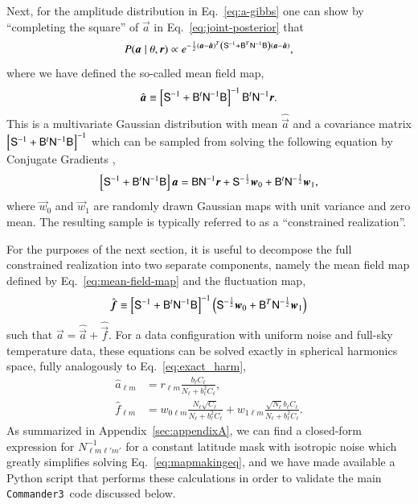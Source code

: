 \documentclass[twocolumn]{../common/aa}
\def\commanderthree{\texttt{Commander3}}
\newcommand{\B}[0]{\tens{B}}
\renewcommand{\a}[0]{\vec{a}}
\newcommand{\f}[0]{\vec{f}}
\newcommand{\N}[0]{\tens{N}}
\newcommand{\w}[0]{\vec{w}}
\renewcommand{\S}[0]{\tens{S}}
\renewcommand{\r}[0]{\vec{r}}
\begin{document}
Next, for the amplitude distribution in Eq.~\eqref{eq:a-gibbs} one can show by ``completing the square'' of $\a$ in Eq.~\eqref{eq:joint-posterior} that 
\begin{equation}
    P(\a \mid \theta, \r) \propto e^{-\frac12 \left(\a - \hat{\a}\right)^T \left(\S^{-1} + \B^T\N^{-1}\B\right) \left(\a - {\hat{\a}}\right)},
\end{equation}
where we have defined the so-called mean field map,
\begin{equation}
\label{eq:mean-field-map}
\hat{\a} \equiv \left[\S^{-1} + \B^t \N^{-1}\B \right]^{-1} \B^t \N^{-1} \r.
\end{equation}
This is a multivariate Gaussian distribution with mean $\hat{\a}$ and a covariance matrix $\left[\S^{-1} + \B^t \N^{-1}\B \right]^{-1}$ which can be sampled from solving the following equation by Conjugate Gradients \citep{shewchuk:1994,seljebotn:2019},
\begin{equation}
    \label{eq:mapmakingeq}
    \left[\S^{-1} + \B^t \N^{-1}\B \right]\a = \B \N^{-1} \r + \S^{-\frac{1}{2}}\w_0 +\B^t \N^{-\frac{1}{2}}\w_1,
\end{equation}
where $\w_0$ and $\w_1$ are randomly drawn Gaussian maps with unit variance and zero mean. The resulting sample is typically referred to as a ``constrained realization''.

For the purposes of the next section, it is useful to decompose the full constrained realization into two separate components, namely the mean field map defined by Eq.~\eqref{eq:mean-field-map} and the fluctuation map, 
\begin{equation}
\label{eq:fluc-map}
\hat{\f} \equiv \left[\S^{-1} + \B^t \N^{-1}\B \right]^{-1} \left(\S^{-\frac{1}{2}}\w_0 +\B^T \N^{-\frac{1}{2}}\w_1 \right)
\end{equation}
such that $\a = \hat{\a} + \hat{\f}$. For a data configuration with uniform noise and full-sky temperature data, these equations can be solved exactly in spherical harmonics space, fully analogously to Eq.~\eqref{eq:exact_harm},
\begin{align}
    \label{eq:hat_s_approx}
    \hat{a}_{\ell m} &= r_{\ell m}\frac{b_{\ell}C_{\ell}}{N_\ell + b_{\ell}^2C_{\ell}},\\
    \label{eq:hat_f_approx}
    \hat{f}_{\ell m} &= w_{0\ell m}\frac{N_{\ell}\sqrt{C_{\ell}}}{N_\ell + b_{\ell}^2C_{\ell}}+w_{1\ell m}\frac{\sqrt{N_{\ell}}b_{\ell}C_\ell}{N_\ell + b_{\ell}^2C_{\ell}}.
\end{align}
As summarized in 
Appendix~\ref{sec:appendixA}, we can find a closed-form expression for $N_{\ell m\ell'm'}^{-1}$ for a constant latitude mask with isotropic noise which greatly simplifies solving Eq.~\eqref{eq:mapmakingeq}, and we have made available a Python script that performs these calculations in order to validate the main \commanderthree\ code discussed below.
\end{document}
